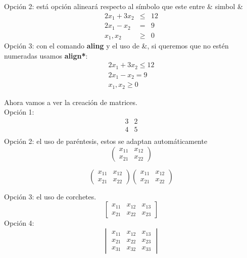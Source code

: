\documentclass[12pt]{article}
\begin{document}
Opción 2: está opción alineará respecto al símbolo que este entre \& simbol \&
\begin{eqnarray*}
    2x_{1}+3x_{2} &\leq& 12 \\
    2x_{1} - x_{2} &=& 9 \\
    x_{1},x_{2} &\geq& 0
\end{eqnarray*}
Opción 3: con el comando \textbf{aling} y el uso de \&, si queremos que no estén numeradas usamos \textbf{align*}:
\begin{align*}
    2x_{1}+3x_{2} \leq 12\\
    2x_{1} - x_{2} = 9 \\
    x_{1},x_{2} \geq 0
\end{align*}
\par
Ahora vamos a ver la creación de matrices.\\
Opción 1:
\begin{equation}
    \begin{matrix}
     3 &  2 \\
     4 & 5 \\
    \end{matrix}
\end{equation}
Opción 2: el uso de paréntesis, estos se adaptan automáticamente
\begin{equation*}
    \begin{pmatrix}
     x_{11} & x_{12} \\
     x_{21} & x_{22} 
    \end{pmatrix}
\end{equation*}

\begin{equation}
    \begin{pmatrix}
     x_{11} & x_{12} \\
     x_{21} & x_{22} 
    \end{pmatrix}
     \begin{pmatrix}
     x_{11} & x_{12} \\
     x_{21} & x_{22} 
    \end{pmatrix}
\end{equation}

Opción 3: el uso de corchetes.
\begin{equation}
   \begin{bmatrix}
    x_{11} & x_{12} & x_{13} \\
     x_{21} & x_{22} & x_{23}
    \end{bmatrix}
\end{equation}
Opción 4:
\begin{equation}
   \begin{vmatrix}
     x_{11} & x_{12} & x_{13} \\
     x_{21} & x_{22} & x_{23}\\
     x_{31} & x_{32} & x_{33}
    \end{vmatrix}
\end{equation}
\end{document}
